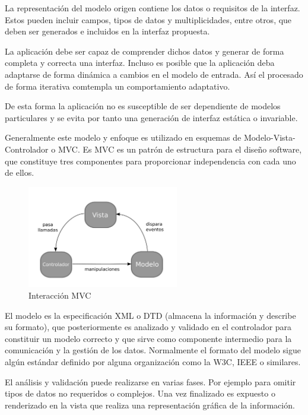 La representación del modelo origen contiene los datos o
requisitos de la interfaz. Estos pueden incluir campos, tipos de datos y
multiplicidades, entre otros, que deben ser generados e incluidos en la interfaz
propuesta.

La aplicación debe ser capaz de comprender dichos
datos y generar de forma completa y correcta una interfaz. Incluso es posible
que la aplicación deba adaptarse de forma dinámica a cambios en el modelo de
entrada. Así el procesado de forma iterativa comtempla un comportamiento
adaptativo.

De esta forma la aplicación no es susceptible de ser dependiente de modelos
particulares y se evita por tanto una generación de interfaz estática o
invariable.

Generalmente este modelo y enfoque es utilizado en esquemas de 
Modelo-Vista-Controlador o \acs{MVC}\label{acro:MVC}. Es MVC es un patrón de
estructura para el diseño software, que constituye tres componentes para proporcionar
independencia con cada uno de ellos.

\newpage

\begin{figure}[ht]
    \begin{center}
        \includegraphics[width=250px]{src/img/MVC-vectorized.pdf}
        \caption[Interacción MVC] {Interacción MVC}
        \label{fig:InteraccionMVC}
    \end{center}
\end{figure}

El modelo es la especificación XML o \acs{DTD}\label{acro:DTD} (almacena la
información y describe su formato), que posteriormente es analizado y validado
en el controlador para constituir un modelo correcto y que sirve como componente 
intermedio para la comunicación y la gestión 
de los datos. Normalmente el formato del modelo sigue algún estándar definido
por alguna organización como la \acs{W3C}\label{acro:W3C},
\acs{IEEE}\label{acro:IEEE} o similares.

El análisis y validación puede realizarse en varias fases. Por ejemplo para 
omitir tipos de datos no requeridos o complejos. Una vez finalizado es expuesto
o renderizado en la vista que realiza una representación gráfica de 
la información.

